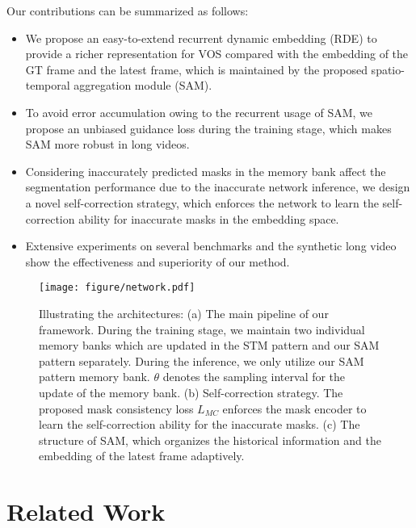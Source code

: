 \documentclass[10pt,twocolumn,letterpaper]{article}
\begin{document}
Our contributions can be summarized as follows:
\vspace{-0.7em}
\begin{itemize}
    \item We propose an easy-to-extend recurrent dynamic embedding (RDE) to provide a richer representation for VOS compared with the embedding of the GT frame and the latest frame, which is maintained by the proposed spatio-temporal aggregation module (SAM).
    \vspace{-.5em}
    \item To avoid error accumulation owing to the recurrent usage of SAM, we propose an unbiased guidance loss during the training stage, which makes SAM  more robust in long videos. 
    \vspace{-.5em}
    \item Considering inaccurately predicted masks in the memory bank affect the segmentation performance due to the inaccurate network inference, we design a novel self-correction strategy, which enforces the network to learn the self-correction ability for inaccurate masks in the embedding space.
    \vspace{-.5em}
    \item Extensive experiments on several benchmarks and  the synthetic long video show the effectiveness and superiority of our method.
\end{itemize}
\vspace{-.5em}



\begin{figure*}[!t]
\centering \texttt{[image: figure/network.pdf]}
\vspace{-1.2em}
\caption{
Illustrating the architectures: (a) The main pipeline of our framework. During the training stage, we maintain two individual memory banks which are updated in the STM pattern and our SAM pattern separately. During the inference, we only utilize our SAM pattern memory bank. $\theta$ denotes the sampling interval for the update of the memory bank. (b) Self-correction strategy. The proposed mask consistency loss $L_{MC}$ enforces the mask encoder to learn the self-correction ability for the inaccurate masks. (c) The structure of SAM, which organizes the historical information and the embedding of the latest frame adaptively. }
\vspace{-1em}
\label{fig:network}
\end{figure*}


\section{Related Work \label{sec:related}}
\end{document}
